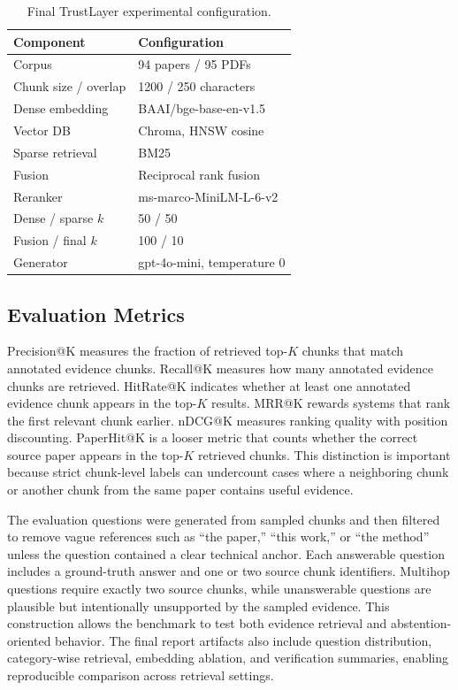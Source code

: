 \documentclass[11pt]{article}
\newcommand{\tablefont}{\footnotesize}
\begin{document}
\begin{table}[t]
\centering
\tablefont
\setlength{\tabcolsep}{3pt}
\begin{tabular}{p{}p{}}
\hline
\textbf{Component} & \textbf{Configuration} \\
\hline
Corpus & 94 papers / 95 PDFs \\
Chunk size / overlap & 1200 / 250 characters \\
Dense embedding & BAAI/bge-base-en-v1.5 \\
Vector DB & Chroma, HNSW cosine \\
Sparse retrieval & BM25 \\
Fusion & Reciprocal rank fusion \\
Reranker & ms-marco-MiniLM-L-6-v2 \\
Dense / sparse $k$ & 50 / 50 \\
Fusion / final $k$ & 100 / 10 \\
Generator & gpt-4o-mini, temperature 0 \\
\hline
\end{tabular}
\caption{Final TrustLayer experimental configuration.}
\label{tab:config}
\end{table}

\subsection{Evaluation Metrics}

Precision@K measures the fraction of retrieved top-$K$ chunks that match annotated evidence chunks. Recall@K measures how many annotated evidence chunks are retrieved. HitRate@K indicates whether at least one annotated evidence chunk appears in the top-$K$ results. MRR@K rewards systems that rank the first relevant chunk earlier. nDCG@K measures ranking quality with position discounting. PaperHit@K is a looser metric that counts whether the correct source paper appears in the top-$K$ retrieved chunks. This distinction is important because strict chunk-level labels can undercount cases where a neighboring chunk or another chunk from the same paper contains useful evidence.

The evaluation questions were generated from sampled chunks and then filtered to remove vague references such as ``the paper,'' ``this work,'' or ``the method'' unless the question contained a clear technical anchor. Each answerable question includes a ground-truth answer and one or two source chunk identifiers. Multihop questions require exactly two source chunks, while unanswerable questions are plausible but intentionally unsupported by the sampled evidence. This construction allows the benchmark to test both evidence retrieval and abstention-oriented behavior. The final report artifacts also include question distribution, category-wise retrieval, embedding ablation, and verification summaries, enabling reproducible comparison across retrieval settings.
\end{document}
